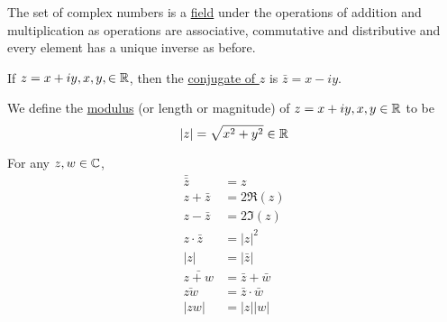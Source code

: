 \documentclass[11pt]{article}
\begin{document}
\begin{remark}
	The set of complex numbers is a \underline{field} under the operations of
	addition and multiplication as operations are associative, commutative
	and distributive and every element has a unique inverse as before.
\end{remark}
\begin{definition}
	If $z = x+iy, x, y, \in \mathbb{R}$, then the \underline{conjugate of $z$} is
	$\bar{z} = x-iy$.
\end{definition}
\begin{definition}
	We define the \underline{modulus} (or length or magnitude) of $z = x+iy,
	x, y \in \mathbb{R}$ to be
	\begin{equation*}
		|z| = \sqrt{x^2+y^2} \in \mathbb{R}
	\end{equation*}
\end{definition}
\begin{remark}
	For any $z, w \in \mathbb{C}$,
	\begin{align*}
		\bar{\bar{z}} &= z\\
		z+\bar{z} &= 2\Re(z)\\
		z-\bar{z} &= 2\Im(z)\\
		z\cdot\bar{z} &= |z|^2\\
		|z| &= |\bar{z}|\\
		\bar{z+w} &= \bar z+\bar w\\
		\bar{zw} &= \bar z\cdot\bar w\\
		|zw| &= |z||w|
	\end{align*}
\end{remark}
\end{document}
